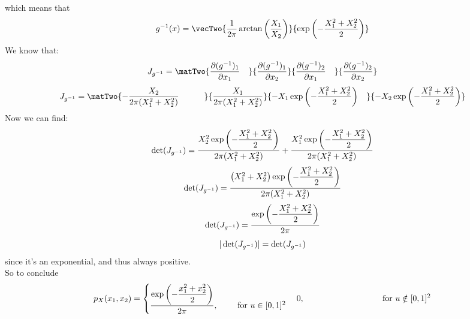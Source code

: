 \documentclass[12pt]{article}
\begin{document}
which means that
\[ g\inv(x) = \vecTwo
{\dfrac{1}{2\pi}\arctan\para{\dfrac{X_1}{X_2}}}
{\exp\para{-\dfrac{X_1^2 + X_2^2}{2}} } \]
We know that:
\[ J_{g\inv} = \matTwo
{\partialdd{(g\inv)_1}{x_1} \hspace{10pt}}
{\partialdd{(g\inv)_1}{x_2} \vspace{10pt}}
{\partialdd{(g\inv)_2}{x_1} \hspace{10pt}}
{\partialdd{(g\inv)_2}{x_2}} \]
\[ J_{g\inv} = \matTwo
{-\dfrac{X_2}{2\pi(X_1^2 + X_2^2)} \hspace{30pt}
\vspace{10pt}}
{\dfrac{X_1}{2\pi(X_1^2 + X_2^2)}}
{-X_1\exp\para{-\dfrac{X_1^2 + X_2^2}{2}} 
\hspace{10pt}}
{-X_2\exp\para{-\dfrac{X_1^2 + X_2^2}{2}}} \]
Now we can find:
\[ \det(J_{g^{-1}}) = 
\dfrac{X_2^2 \exp\left( -\dfrac{X_1^2 + X_2^2}{2} \right)}
{2\pi(X_1^2 + X_2^2)}
+ \dfrac{X_1^2 \exp\left( -\dfrac{X_1^2 + X_2^2}{2} \right)}
{2\pi(X_1^2 + X_2^2)}\]
\[ \det(J_{g^{-1}}) = 
\dfrac{\left( X_1^2 + X_2^2  \right)
\exp\left( -\dfrac{X_1^2 + X_2^2}{2} \right)}
{2\pi(X_1^2 + X_2^2)} \]
\[ \det(J_{g^{-1}}) = 
\dfrac{\exp\left( -\dfrac{X_1^2 + X_2^2}{2} \right)}{2\pi} \]
\[ |\det(J_{g^{-1}})| = \det(J_{g^{-1}}) \]
since it's an exponential,
and thus always positive. \\
So to conclude
\[ p_X(x_1, x_2) =
\begin{cases} 
\dfrac{\exp\left( -\dfrac{x_1^2 + x_2^2}{2} \right)}{2\pi}, 
\qquad \text{ for } u \in [0, 1]^2 \end{cases}
{ 0, \qquad \qquad \qquad \qquad \quad 
\text{ for } u \notin [0, 1]^2} \]
\end{document}
